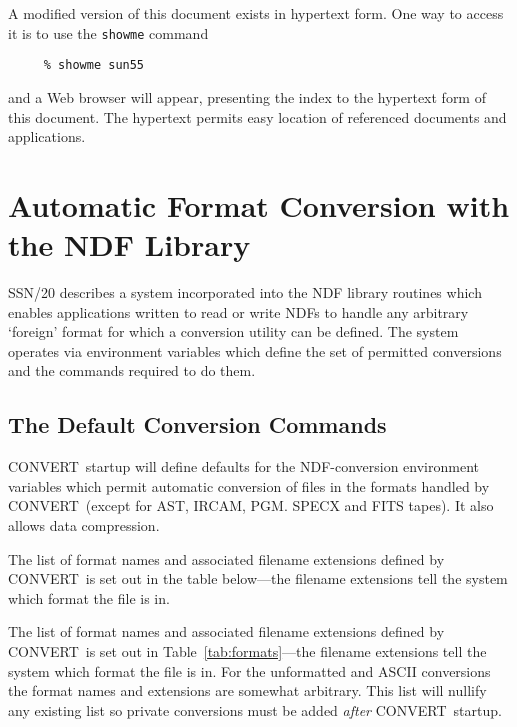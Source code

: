 \documentclass[twoside,11pt]{article}
\newenvironment{latexonly}{}{}
\newcommand{\xref}[3]{#1}
\newcommand{\xlabel}[1]{}
\newcommand{\CONVERT}{{\footnotesize CONVERT}}
\begin{document}
A modified version of this document exists in hypertext form.  One way
to access it is to use the
\xref{\texttt{showme}}{sun188}{displaying_parts_of_documents} command

\small
\begin{verbatim}
     % showme sun55
\end{verbatim}
\normalsize
and a Web browser will appear, presenting the index to the hypertext
form of this document.  The hypertext permits easy location of
referenced documents and applications.

\newpage 
\section{\label{sect_auto}\xlabel{sect_auto}Automatic Format Conversion with
the NDF Library}
\xref{SSN/20}{ssn20}{} describes a system incorporated into the 
\xref{NDF library}{sun33}{}
routines which enables applications written to read or write NDFs to handle
any arbitrary `foreign' format for which a conversion utility can be defined.
The system operates via environment variables which define the set of permitted 
conversions and the commands required to do them.

\subsection{\xlabel{the_default_conversion_commands}The Default Conversion Commands}
\CONVERT\ startup will define defaults for the NDF-conversion environment 
variables which permit automatic conversion of files in the formats handled by 
\CONVERT\ (except for AST, IRCAM, PGM. SPECX and FITS tapes).
It also allows data compression. 

\begin{htmlonly}
The list of format names and associated filename extensions defined by 
\CONVERT\ is set out in the table below---the filename extensions tell the 
system which format the file is in.
\end{htmlonly}
\begin{latexonly}
The list of format names and associated filename extensions
defined by \CONVERT\ is set out in Table~\ref{tab:formats}---the filename 
extensions tell the system which format the file is in. For the unformatted 
and ASCII conversions the format names and extensions are somewhat arbitrary.
\end{latexonly}
This list will nullify any existing list so private conversions must be added
{\em after\/} \CONVERT\ startup.
\end{document}
